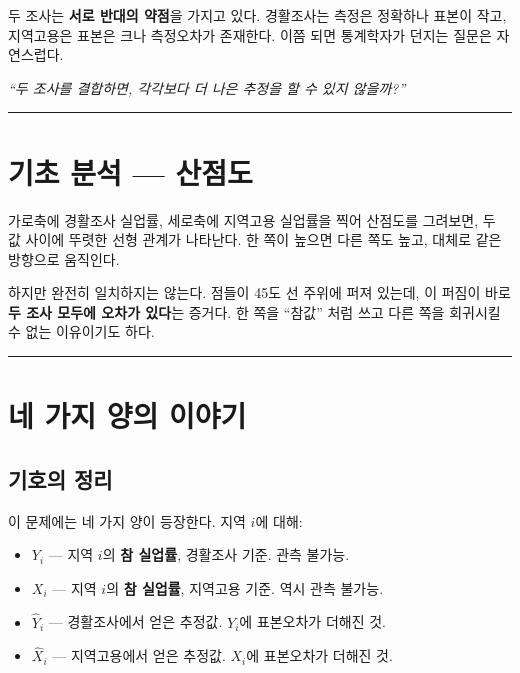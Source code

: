 \documentclass[
  letterpaper,
  DIV=11,
  numbers=noendperiod]{scrreprt}
\providecommand{\tightlist}{%
  \setlength{\itemsep}{0pt}\setlength{\parskip}{0pt}}
\begin{document}
두 조사는 \textbf{서로 반대의 약점}을 가지고 있다. 경활조사는 측정은
정확하나 표본이 작고, 지역고용은 표본은 크나 측정오차가 존재한다. 이쯤
되면 통계학자가 던지는 질문은 자연스럽다.

\emph{``두 조사를 결합하면, 각각보다 더 나은 추정을 할 수 있지
않을까?''}

\begin{center}\rule{0.5\linewidth}{0.5pt}\end{center}

\section{기초 분석 ---
산점도}\label{uxae30uxcd08-uxbd84uxc11d-uxc0b0uxc810uxb3c4}

가로축에 경활조사 실업률, 세로축에 지역고용 실업률을 찍어 산점도를
그려보면, 두 값 사이에 뚜렷한 선형 관계가 나타난다. 한 쪽이 높으면 다른
쪽도 높고, 대체로 같은 방향으로 움직인다.

하지만 완전히 일치하지는 않는다. 점들이 45도 선 주위에 퍼져 있는데, 이
퍼짐이 바로 \textbf{두 조사 모두에 오차가 있다}는 증거다. 한 쪽을
``참값'' 처럼 쓰고 다른 쪽을 회귀시킬 수 없는 이유이기도 하다.

\begin{center}\rule{0.5\linewidth}{0.5pt}\end{center}

\section{네 가지 양의
이야기}\label{uxb124-uxac00uxc9c0-uxc591uxc758-uxc774uxc57cuxae30}

\subsection{기호의 정리}\label{uxae30uxd638uxc758-uxc815uxb9ac}

이 문제에는 네 가지 양이 등장한다. 지역 \(i\)에 대해:

\begin{itemize}
\tightlist
\item
  \(Y_i\) --- 지역 \(i\)의 \textbf{참 실업률}, 경활조사 기준. 관측
  불가능.
\item
  \(X_i\) --- 지역 \(i\)의 \textbf{참 실업률}, 지역고용 기준. 역시 관측
  불가능.
\item
  \(\hat{Y}_i\) --- 경활조사에서 얻은 추정값. \(Y_i\)에 표본오차가
  더해진 것.
\item
  \(\hat{X}_i\) --- 지역고용에서 얻은 추정값. \(X_i\)에 표본오차가
  더해진 것.
\end{itemize}
\end{document}
